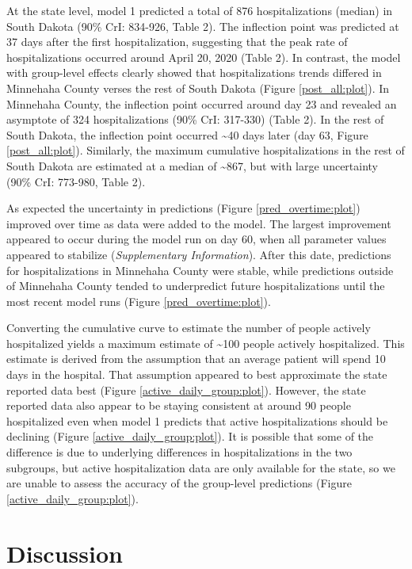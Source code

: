 \documentclass[
]{article}
\begin{document}
At the state level, model 1 predicted a total of 876 hospitalizations (median) in South Dakota (90\% CrI: 834-926, Table 2). The inflection point was predicted at 37 days after the first hospitalization, suggesting that the peak rate of hospitalizations occurred around April 20, 2020 (Table 2). In contrast, the model with group-level effects clearly showed that hospitalizations trends differed in Minnehaha County verses the rest of South Dakota (Figure \ref{post_all:plot}). In Minnehaha County, the inflection point occurred around day 23 and revealed an asymptote of 324 hospitalizations (90\% CrI: 317-330) (Table 2). In the rest of South Dakota, the inflection point occurred \textasciitilde40 days later (day 63, Figure \ref{post_all:plot}). Similarly, the maximum cumulative hospitalizations in the rest of South Dakota are estimated at a median of \textasciitilde867, but with large uncertainty (90\% CrI: 773-980, Table 2).

As expected the uncertainty in predictions (Figure \ref{pred_overtime:plot}) improved over time as data were added to the model. The largest improvement appeared to occur during the model run on day 60, when all parameter values appeared to stabilize (\emph{Supplementary Information}). After this date, predictions for hospitalizations in Minnehaha County were stable, while predictions outside of Minnehaha County tended to underpredict future hospitalizations until the most recent model runs (Figure \ref{pred_overtime:plot}).

Converting the cumulative curve to estimate the number of people actively hospitalized yields a maximum estimate of \textasciitilde100 people actively hospitalized. This estimate is derived from the assumption that an average patient will spend 10 days in the hospital. That assumption appeared to best approximate the state reported data best (Figure \ref{active_daily_group:plot}). However, the state reported data also appear to be staying consistent at around 90 people hospitalized even when model 1 predicts that active hospitalizations should be declining (Figure \ref{active_daily_group:plot}). It is possible that some of the difference is due to underlying differences in hospitalizations in the two subgroups, but active hospitalization data are only available for the state, so we are unable to assess the accuracy of the group-level predictions (Figure \ref{active_daily_group:plot}).

\hypertarget{discussion}{%
\section{Discussion}\label{discussion}}
\end{document}
